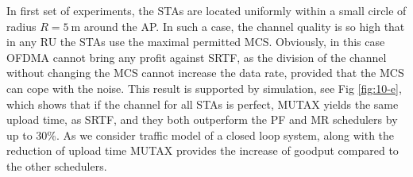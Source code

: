 

In first set of experiments, the STAs are located uniformly within a small circle of radius $R = \SI{5}{\m}$ around the AP.
In such a case, the channel quality is so high that in any RU the STAs use the maximal permitted MCS.
Obviously, in this case OFDMA cannot bring any profit against SRTF, as the division of the channel without changing the MCS cannot increase the data rate, provided that the MCS can cope with the noise.
This result is supported by simulation, see Fig \ref{fig:10-e}, which shows that if the channel for all STAs is perfect, MUTAX yields the same upload time, as SRTF, and they both outperform the PF and MR schedulers by up to 30\%. 
As we consider traffic model of a closed loop system, along with the reduction of upload time MUTAX provides the increase of goodput compared to the other schedulers.

